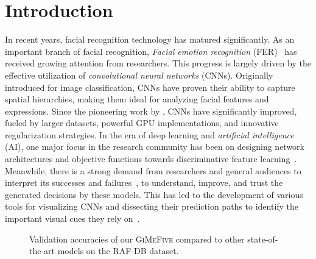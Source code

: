\section{Introduction}
\label{sec:intro}

In recent years, facial recognition technology has matured significantly. 
As an important branch of facial recognition, 
\textit{Facial emotion recognition} (FER)~\cite{Ko18,JainSS19,YinTLS019,Malik0R21} has received growing attention from researchers. 
This progress is largely driven by the effective utilization of \textit{convolutional neural networks} (CNNs). 
Originally introduced for image classification, 
CNNs have proven their ability to capture spatial hierarchies, 
making them ideal for analyzing facial features and expressions. 
Since the pioneering work by \citet{Lecun89Backpropagation}, 
CNNs have significantly improved, fueled by larger datasets, 
powerful GPU implementations, 
and innovative regularization strategies. 
In the era of deep learning and \textit{artificial intelligence} (AI), 
one major focus in the research community has been on designing network architectures 
and objective functions towards discriminative feature learning~\cite{HeZRS16, liu2017learning, wen2016discriminative}. 
Meanwhile, 
there is a strong demand from researchers and general audiences to interpret its successes and failures~\cite{GoodfellowSS14}, 
to understand, improve, and trust the generated decisions by these models. 
This has led to the development of various tools for visualizing CNNs and dissecting their prediction paths to identify the important visual cues they rely on~\cite{olah2018building}. 

\begin{figure}[ht]
  \centering
  \caption{Validation accuracies of our \textsc{GiMeFive} compared to other state-of-the-art models on the RAF-DB dataset.} 
  \label{fig:acc}
\end{figure}

